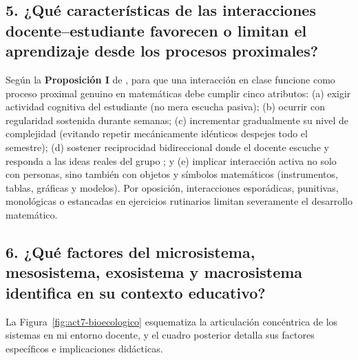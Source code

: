 \documentclass[spanish,letterpaper,oneside]{article}
\begin{document}
\subsection*{5. ¿Qué características de las interacciones docente--estudiante favorecen o limitan el aprendizaje desde los procesos proximales?}
Según la \textbf{Proposición I} de \citet{bronfenbrenner2006bioecologico}, para que una interacción en clase funcione como proceso proximal genuino en matemáticas debe cumplir cinco atributos: (a) exigir actividad cognitiva del estudiante (no mera escucha pasiva); (b) ocurrir con regularidad sostenida durante semanas; (c) incrementar gradualmente su nivel de complejidad (evitando repetir mecánicamente idénticos despejes todo el semestre); (d) sostener reciprocidad bidireccional donde el docente escuche y responda a las ideas reales del grupo \citep{eef2021feedback}; y (e) implicar interacción activa no solo con personas, sino también con objetos y símbolos matemáticos (instrumentos, tablas, gráficas y modelos). Por oposición, interacciones esporádicas, punitivas, monológicas o estancadas en ejercicios rutinarios limitan severamente el desarrollo matemático.

\subsection*{6. ¿Qué factores del microsistema, mesosistema, exosistema y macrosistema identifica en su contexto educativo?}
La Figura~\ref{fig:act7-bioecologico} esquematiza la articulación concéntrica de los sistemas en mi entorno docente, y el cuadro posterior detalla sus factores específicos e implicaciones didácticas.
\end{document}

